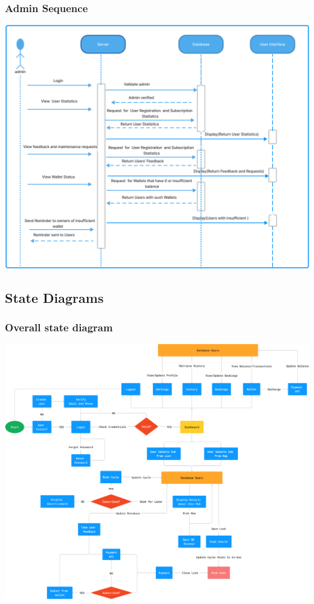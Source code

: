 \documentclass[11pt]{article}
\begin{document}
\subsubsection{Admin Sequence}
\begin{center}
  \includegraphics[scale=0.3]{sequence-diagram-images/admin.png}
\end{center}


\subsection{State Diagrams}
\subsubsection{Overall state diagram}
\begin{center}
  \includegraphics[scale=0.105]{state-diagram-images/overall.png}
\end{center}
\end{document}
